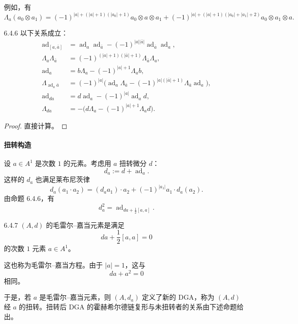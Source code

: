 例如，有
\[
\Lambda_a(a_0\otimes a_1)
=(-1)^{|a|+(|a|+1)(|a_0|+1)}a_0\otimes a\otimes a_1
+(-1)^{|a|+(|a|+1)(|a_0|+|a_1|+2)}a_0\otimes a_1\otimes a.
\]

\begin{proposition}{6.4.6}
  以下关系成立：
  \begin{align*}
  \operatorname{ad}_{[a,\bar a]}
  &=\operatorname{ad}_a\operatorname{ad}_{\bar a}
  -(-1)^{|a||\bar a|}\operatorname{ad}_{\bar a}\operatorname{ad}_a,\\
  \Lambda_a\Lambda_{\bar a}
  &=(-1)^{(|a|+1)(|\bar a|+1)}\Lambda_{\bar a}\Lambda_a,\\
  \operatorname{ad}_a
  &=b\Lambda_a-(-1)^{|a|+1}\Lambda_ab,\\
  \Lambda_{\operatorname{ad}_a\bar a}
  &=(-1)^{|a|}\bigl(\operatorname{ad}_a\Lambda_{\bar a}
  -(-1)^{|a|(|\bar a|+1)}\Lambda_{\bar a}\operatorname{ad}_a\bigr),\\
  \operatorname{ad}_{da}
  &=d\operatorname{ad}_a-(-1)^{|a|}\operatorname{ad}_ad,\\
  \Lambda_{da}
  &=-\bigl(d\Lambda_a-(-1)^{|a|+1}\Lambda_ad\bigr).
  \end{align*}
\end{proposition}

\begin{proof}
  直接计算。
\end{proof}

\paragraph{扭转构造}\par

设 $a\in A^1$ 是次数 $1$ 的元素。考虑用 $a$ 扭转微分 $d$：
\[
d_a:=d+\operatorname{ad}_a.
\]
这样的 $d_a$ 也满足莱布尼茨律
\[
d_a(a_1\cdot a_2)=(d_aa_1)\cdot a_2+(-1)^{|a_1|}a_1\cdot d_a(a_2).
\]
由命题 6.4.6，有
\[
d_a^2=\operatorname{ad}_{da+\frac12[a,a]}.
\]

\begin{definition}{6.4.7}
  $(A,d)$ 的毛雷尔–嘉当元素是满足
  \[
  da+\frac12[a,a]=0
  \]
  的次数 $1$ 元素 $a\in A^1$。
\end{definition}

这也称为毛雷尔–嘉当方程。由于 $|a|=1$，这与
\[
da+a^2=0
\]
相同。

于是，若 $a$ 是毛雷尔–嘉当元素，则 $(A,d_a)$ 定义了新的 DGA，称为 $(A,d)$ 经 $a$ 的扭转。扭转后 DGA 的霍赫希尔德链复形与未扭转者的关系由下述命题给出。

